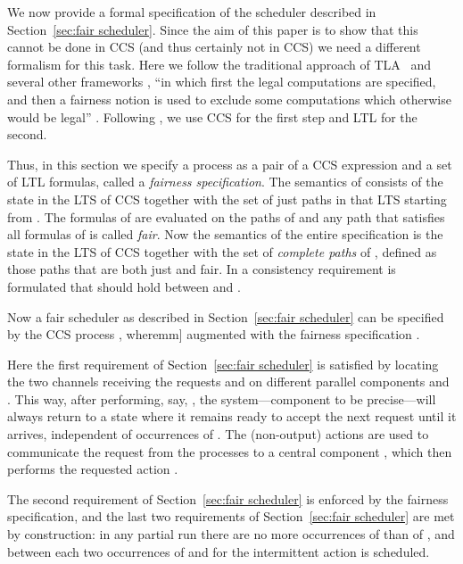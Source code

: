 \documentclass[smallcondensed]{svjour3}
\newcommand{\Sect}[1]{Section~\ref{sec:#1}}
\newcounter {part}
\begin{document}
\renewcommand{\d}[1]{c_{#1}}
\newcommand{\db}[1]{c_{{#1}}!}
\newcommand{\dr}[1]{c_{#1}?}
\newcommand{\tb}[1]{t_{#1}}
\newcommand{\tr}[1]{t_{#1}?}
\newcommand{\e}{e}
\newcommand{\BB}[1]{B_{#1}}

We now provide a formal specification of the scheduler described in \Sect{fair scheduler}.
Since the aim of this paper is to show that this cannot be done in CCS (and thus certainly not
in CCS) we need a different formalism for this task. Here we follow the
traditional approach of TLA~\cite{TLA} and several other frameworks \cite{Fr86}, ``in which
first the legal computations are specified, and then a fairness notion
is used to exclude some computations which otherwise would be legal'' \cite{AFK88}.
Following \cite{GH14}, we use CCS for the first step and LTL for the second.

Thus, in this section we specify a process as a pair of a CCS expression  and a set  of LTL
formulas, called a \emph{fairness specification}. The semantics of  consists of the state  in
the LTS of CCS together with the set of just paths in that LTS starting from . 
The formulas of  are evaluated on the paths of  and any path that satisfies all
formulas of  is called \emph{fair}. Now the semantics of the entire specification  is the
state  in the LTS of CCS together with the set of \emph{complete paths} of ,
defined as those paths that are both just and fair.
In \cite{TR13,GH14} a consistency requirement is formulated that should hold between  and .

Now a fair scheduler as described in \Sect{fair scheduler} can be specified by the CCS process
, 
where\1mm]
augmented with the fairness specification
.

Here the first requirement of \Sect{fair scheduler} is satisfied by locating the two
channels receiving the requests  and  on different parallel components  and .
This way, after performing, say, , the system---component  to be precise---will always return
to a state where it remains ready to accept the next request  until it arrives, independent of
occurrences of .
The (non-output) actions  are used to communicate the request from the processes  to 
a central component , which then performs the requested action .

The second requirement of \Sect{fair scheduler} is enforced by the fairness specification,
and the last two requirements of \Sect{fair scheduler} are met by construction:
in any partial run there are no more occurrences of  than of ,
and between each two occurrences of  and  for  the intermittent action  is scheduled.
\end{document}
